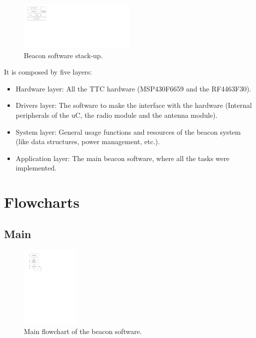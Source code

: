 \documentclass[12pt]{book}
\begin{document}
\begin{figure}[!h]
	\begin{center}
		\includegraphics[width=0.5\textwidth]{figures/beacon_software_layers.pdf}
		\caption{Beacon software stack-up.}
		\label{fig:beacon-software-layers}
	\end{center}
\end{figure}

It is composed by five layers:

\begin{itemize}
    \item Hardware layer: All the TTC hardware (MSP430F6659 and the RF4463F30).
    \item Drivers layer: The software to make the interface with the hardware (Internal peripherals of the uC, the radio module and the antenna module).
    \item System layer: General usage functions and resources of the beacon system (like data structures, power management, etc.).
    \item Application layer: The main beacon software, where all the tasks were implemented.
\end{itemize}

\section{Flowcharts}

\subsection{Main}

\begin{figure}[!h]
	\begin{center}
		\includegraphics[width=0.25\textwidth]{figures/beacon_main_flowchart.pdf}
		\caption{Main flowchart of the beacon software.}
		\label{fig:beacon-main-flowchart}
	\end{center}
\end{figure}
\end{document}
